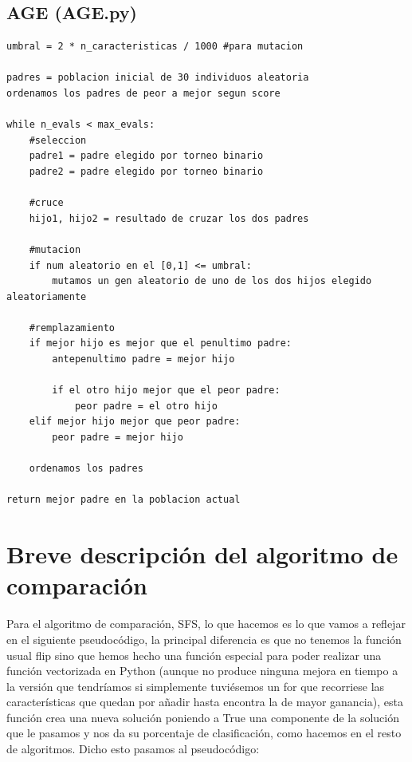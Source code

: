 \documentclass[10pt,a4paper]{article}
\begin{document}
\newpage

\subsection{\color[rgb]{0.0,0.0,0.51}AGE (AGE.py)}

\begin{lstlisting}
umbral = 2 * n_caracteristicas / 1000 #para mutacion

padres = poblacion inicial de 30 individuos aleatoria
ordenamos los padres de peor a mejor segun score

while n_evals < max_evals:
	#seleccion
	padre1 = padre elegido por torneo binario
	padre2 = padre elegido por torneo binario
	
	#cruce
	hijo1, hijo2 = resultado de cruzar los dos padres
	
	#mutacion
	if num aleatorio en el [0,1] <= umbral:
		mutamos un gen aleatorio de uno de los dos hijos elegido aleatoriamente
		
	#remplazamiento
	if mejor hijo es mejor que el penultimo padre:
		antepenultimo padre = mejor hijo
		
		if el otro hijo mejor que el peor padre:
			peor padre = el otro hijo
	elif mejor hijo mejor que peor padre:
		peor padre = mejor hijo
		
	ordenamos los padres
	
return mejor padre en la poblacion actual
\end{lstlisting}

\newpage

\section{\color[rgb]{0.0,0.0,0.21}Breve descripción del algoritmo de comparación}

Para el algoritmo de comparación, SFS, lo que hacemos es lo que vamos a reflejar en el siguiente pseudocódigo, la principal diferencia es que no tenemos la función usual flip sino que hemos hecho una función especial para poder realizar una función vectorizada en Python (aunque no produce ninguna mejora en tiempo a la versión que tendríamos si simplemente tuviésemos un for que recorriese las características que quedan por añadir hasta encontra la de mayor ganancia), esta función crea una nueva solución poniendo a True una componente de la solución que le pasamos y nos da su porcentaje de clasificación, como hacemos en el resto de algoritmos. Dicho esto pasamos al pseudocódigo:
\end{document}
